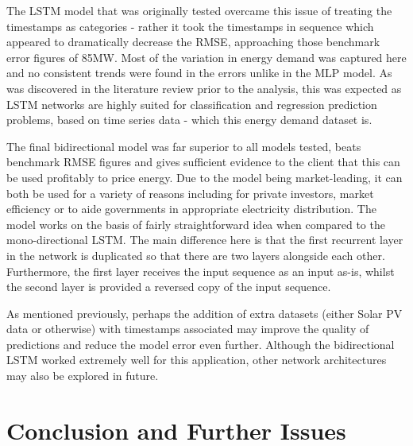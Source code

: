 \documentclass[mstat,12pt]{unswthesis}
\begin{document}
\bigskip

The LSTM model that was originally tested overcame this issue of
treating the timestamps as categories - rather it took the timestamps in
sequence which appeared to dramatically decrease the RMSE, approaching
those benchmark error figures of 85MW. Most of the variation in energy
demand was captured here and no consistent trends were found in the
errors unlike in the MLP model. As was discovered in the literature
review prior to the analysis, this was expected as LSTM networks are
highly suited for classification and regression prediction problems,
based on time series data - which this energy demand dataset is.

\bigskip

The final bidirectional model was far superior to all models tested,
beats benchmark RMSE figures and gives sufficient evidence to the client
that this can be used profitably to price energy. Due to the model being
market-leading, it can both be used for a variety of reasons including
for private investors, market efficiency or to aide governments in
appropriate electricity distribution. The model works on the basis of
fairly straightforward idea when compared to the mono-directional LSTM.
The main difference here is that the first recurrent layer in the
network is duplicated so that there are two layers alongside each other.
Furthermore, the first layer receives the input sequence as an input
as-is, whilst the second layer is provided a reversed copy of the input
sequence.

\bigskip

As mentioned previously, perhaps the addition of extra datasets (either
Solar PV data or otherwise) with timestamps associated may improve the
quality of predictions and reduce the model error even further. Although
the bidirectional LSTM worked extremely well for this application, other
network architectures may also be explored in future.

\hypertarget{conclusion-and-further-issues}{%
\chapter{Conclusion and Further
Issues}\label{conclusion-and-further-issues}}
\end{document}
